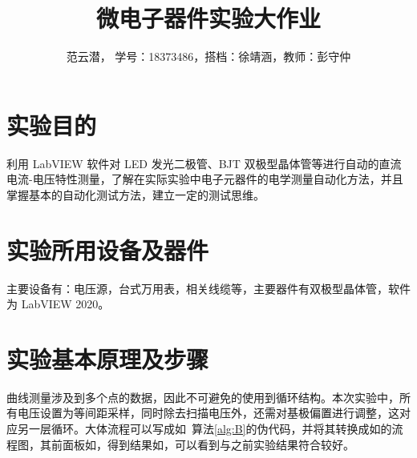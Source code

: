 \documentclass[lang=cn,11pt,a4paper,cite=authoryear]{elegantpaper}
\title{微电子器件实验\quad 大作业}
\author{范云潜， 学号：18373486，搭档：徐靖涵，教师：彭守仲}
\institute{微电子学院 184111 班}
\date{\zhtoday}
\begin{document}
\maketitle


\section{实验目的}


利用 LabVIEW 软件对 LED 发光二极管、BJT 双极型晶体管等进行自动的直流电流-电压特性测量，了解在实际实验中电子元器件的电学测量自动化方法，并且掌握基本的自动化测试方法，建立一定的测试思维。

\section{实验所用设备及器件}


主要设备有：电压源，台式万用表，相关线缆等，主要器件有双极型晶体管，软件为 LabVIEW 2020。

\section{实验基本原理及步骤}

曲线测量涉及到多个点的数据，因此不可避免的使用到循环结构。本次实验中，所有电压设置为等间距采样，同时除去扫描电压外，还需对基极偏置进行调整，这对应另一层循环。大体流程可以写成如~算法\ref{alg:B}的伪代码，并将其转换成如的流程图，其前面板如，得到结果如，可以看到与之前实验结果符合较好。



\end{document}
